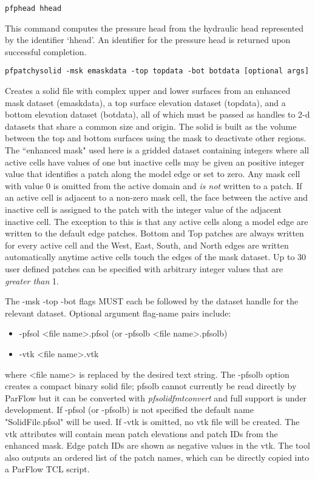 \begin{description}
\item{\begin{verbatim}pfphead hhead\end{verbatim}}
This command computes the pressure head from the hydraulic head
represented by the identifier `hhead'.  An identifier for the pressure
head is returned upon successful completion.

\item{\begin{verbatim}pfpatchysolid -msk emaskdata -top topdata -bot botdata [optional args] \end{verbatim}}
Creates a solid file with complex upper and lower surfaces from an enhanced mask dataset (emaskdata), a top surface elevation dataset (topdata), and
a bottom elevation dataset (botdata), all of which must be passed as handles to 2-d datasets that share a common size and origin. The solid is built as the volume between the top and bottom surfaces using the mask to deactivate other regions. The ``enhanced mask" used here is a gridded dataset containing integers where all
active cells have values of one but inactive cells may be given an positive integer value that identifies
a patch along the model edge or set to zero. Any mask cell with value 0 is omitted from the active domain and \textit{is not} written to a patch.
If an active cell is adjacent to a non-zero mask cell, the face between the active and inactive cell is assigned to the
patch with the integer value of the adjacent inactive cell. The exception to this is that any active cells along a model edge are
written to the default edge patches. Bottom and Top patches are always written for every active cell and the West, East, South, and North
edges are written automatically anytime active cells touch the edges of the mask dataset. Up to 30 user defined patches can be specified with arbitrary integer values that are \textit{greater than} 1.

The -msk -top -bot flags MUST
each be followed by the dataset handle for the relevant dataset. Optional argument flag-name pairs include:
\begin{itemize}
\item{-pfsol} <file name>.pfsol  (or -pfsolb <file name>.pfsolb)
\item{-vtk} <file name>.vtk
\end{itemize}

where <file name> is replaced by the desired text string. The -pfsolb option creates a compact binary solid file; pfsolb cannot currently be read directly by ParFlow but it can be converted with \textit{pfsolidfmtconvert} and full support is under development. If -pfsol (or -pfsolb) is not specified the
default name "SolidFile.pfsol" will be used. If -vtk is omitted, no vtk file will be created. The vtk attributes will contain mean patch elevations and patch IDs from the enhanced mask. Edge patch IDs are shown as negative values in the vtk.
The tool also outputs an ordered list of the patch names, which can be directly copied into a ParFlow TCL script.


\end{description}
